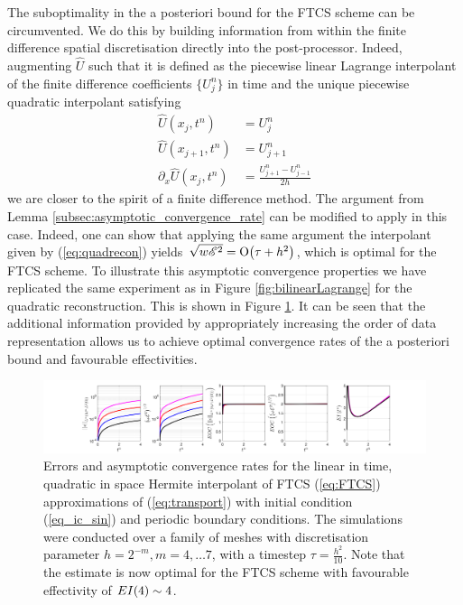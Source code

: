 \documentclass[final]{amsart}
\numberwithin{equation}{section}
\begin{document}
The suboptimality in the a posteriori bound for the FTCS scheme can be
circumvented. We do this by building information from within the
finite difference spatial discretisation directly into the
post-processor. Indeed, augmenting $\widehat U$ such that it is
defined as the piecewise linear Lagrange interpolant of the finite
difference coefficients $\{U^n_j\}$ in time and the unique piecewise
quadratic interpolant satisfying
\begin{equation}
  \label{eq:quadrecon}
\begin{split}
\widehat U(x_j,t^n) &= U^n_j
\\
\widehat U(x_{j+1},t^n) &= U^n_{j+1}
\\
\partial_x \widehat U(x_j, t^n) &= \frac{U^n_{j+1}-U^n_{j-1}}{2h}
\end{split}
\end{equation}
we are closer to the spirit of a finite difference method. The
argument from Lemma \ref{subsec:asymptotic_convergence_rate} can be
modified to apply in this case. Indeed, one can show that applying the
same argument the interpolant given by (\ref{eq:quadrecon}) yields
$\sqrt{w\mathscr E^2} = \operatorname{O}\!\left({\tau+h^2}\right)$, which is optimal for the FTCS
scheme. To illustrate this asymptotic convergence properties we have
replicated the same experiment as in Figure \ref{fig:bilinearLagrange}
for the quadratic reconstruction. This is shown in Figure
\ref{fig:FTCS_prelim_P2}.  It can be seen that the additional
information provided by appropriately increasing the order of data
representation allows us to achieve optimal convergence rates of the a
posteriori bound and favourable effectivities.

\begin{figure}[H] 
	\includegraphics[width=\textwidth]{../figures/fig_FTCSplots_1x5_sin_IC_uniform_P2_ind}	
	\caption{
		\label{fig:FTCS_prelim_P2}
		Errors and asymptotic convergence rates for the linear in time,
		quadratic in space Hermite interpolant of FTCS (\ref{eq:FTCS})
		approximations of (\ref{eq:transport}) with initial condition
		(\ref{eq_ic_sin}) and periodic boundary conditions. The simulations were conducted over a family of
		meshes with discretisation parameter $h = 2^{-m}, m = 4,\dots 7$,
		with a timestep $\tau = \tfrac{h^2}{10}$. Note that the estimate
		is now optimal for the FTCS scheme with favourable effectivity of
		$EI \!\left({4}\right) \sim 4$.}
\end{figure}
\end{document}
